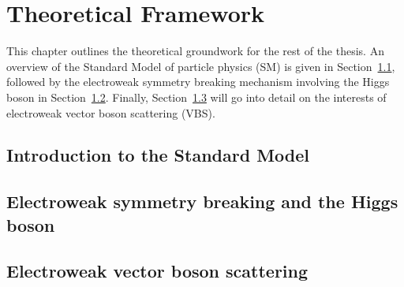 \chapter[Theoretical Framework][Theoretical Framework]{Theoretical Framework} \label{ch:theory}

This chapter outlines the theoretical groundwork for the rest of the thesis.
An overview of the Standard Model of particle physics (SM) is given in Section~\ref{sec:theory_sm}, followed by the electroweak symmetry breaking mechanism involving the Higgs boson in Section~\ref{sec:theory_higgs}.
Finally, Section~\ref{sec:theory_vbs} will go into detail on the interests of electroweak vector boson scattering (VBS).

\section{Introduction to the Standard Model} \label{sec:theory_sm}


\section{Electroweak symmetry breaking and the Higgs boson} \label{sec:theory_higgs}


%

\section{Electroweak vector boson scattering}\label{sec:theory_vbs}

